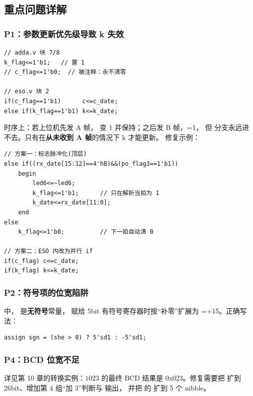 \subsection{重点问题详解}

\subsubsection{P1：参数更新优先级导致 k 失效}

\begin{lstlisting}[style=vsnip]
// adda.v 块 7/8
k_flag<=1'b1;   // 置 1
// c_flag<=1'b0;  // 被注释：永不清零

// eso.v 块 2
if(c_flag==1'b1)      c<=c_date;
else if(k_flag==1'b1) k<=k_date;
\end{lstlisting}

时序上：若上位机先发 A 帧， 变 1 并保持；之后发 B 帧，=1，
但  分支永远进不去。只有在\textbf{从未收到 A 帧}的情况下 k 才能更新。
修复示例：

\begin{lstlisting}[style=vsnip]
// 方案一：标志脉冲化(顶层)
else if((rx_date[15:12]==4'hB)&&(po_flag3==1'b1))
    begin
        led6<=~led6;
        k_flag<=1'b1;      // 只在解析当拍为 1
        k_date<=rx_date[11:0];
    end
else
    k_flag<=1'b0;          // 下一拍自动清 0

// 方案二：ESO 内改为并行 if
if(c_flag) c<=c_date;
if(k_flag) k<=k_date;
\end{lstlisting}

\subsubsection{P2：符号项的位宽陷阱}

 中， 是\textbf{无符号}常量，
赋给 5bit 有符号寄存器时按“补零”扩展为 =+15。正确写法：

\begin{lstlisting}[style=vsnip]
assign sgn = (she > 0) ? 5'sd1 : -5'sd1;
\end{lstlisting}

\subsubsection{P4：BCD 位宽不足}

详见第 10 章的转换实例：$1023$ 的最终 BCD 结果是 0x023。修复需要把
 扩到 26bit、增加第 4 组“加 3”判断与  输出，
并把  的  扩到 5 个 nibble。

